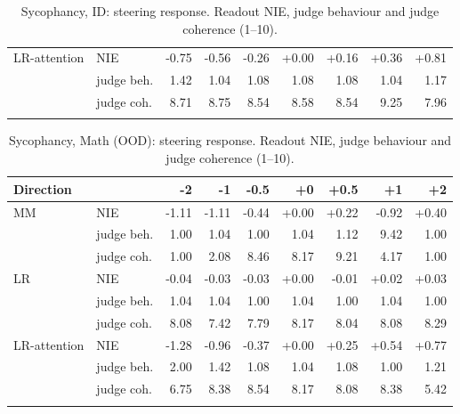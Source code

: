 \begin{table}[H]
\begin{minipage}[t]{0.49\textwidth}
\begin{tabular}{llrrrrrrr}
\addlinespace[2pt]
LR-attention & NIE & -0.75 & -0.56 & -0.26 & +0.00 & +0.16 & +0.36 & +0.81 \\
 & judge beh. & 1.42 & 1.04 & 1.08 & 1.08 & 1.08 & 1.04 & 1.17 \\
 & judge coh. & 8.71 & 8.75 & 8.54 & 8.58 & 8.54 & 9.25 & 7.96 \\
\addlinespace[2pt]
\bottomrule
\end{tabular}
\caption{Sycophancy, ID: steering response. Readout NIE, judge behaviour and judge coherence (1--10).}
\label{tab:app-steer-sycophancy-ID}
\end{minipage}
\end{table}

\begin{table}[H]
\centering
\begin{minipage}[t]{0.49\textwidth}
\centering
\centering
\scriptsize
\setlength{\tabcolsep}{3pt}
\begin{tabular}{llrrrrrrr}
\toprule
Direction & & -2 & -1 & -0.5 & +0 & +0.5 & +1 & +2 \\
\midrule
MM & NIE & -1.11 & -1.11 & -0.44 & +0.00 & +0.22 & -0.92 & +0.40 \\
 & judge beh. & 1.00 & 1.04 & 1.00 & 1.04 & 1.12 & 9.42 & 1.00 \\
 & judge coh. & 1.00 & 2.08 & 8.46 & 8.17 & 9.21 & 4.17 & 1.00 \\
\addlinespace[2pt]
LR & NIE & -0.04 & -0.03 & -0.03 & +0.00 & -0.01 & +0.02 & +0.03 \\
 & judge beh. & 1.04 & 1.04 & 1.00 & 1.04 & 1.00 & 1.04 & 1.00 \\
 & judge coh. & 8.08 & 7.42 & 7.79 & 8.17 & 8.04 & 8.08 & 8.29 \\
\addlinespace[2pt]
LR-attention & NIE & -1.28 & -0.96 & -0.37 & +0.00 & +0.25 & +0.54 & +0.77 \\
 & judge beh. & 2.00 & 1.42 & 1.08 & 1.04 & 1.08 & 1.00 & 1.21 \\
 & judge coh. & 6.75 & 8.38 & 8.54 & 8.17 & 8.08 & 8.38 & 5.42 \\
\addlinespace[2pt]
\bottomrule
\end{tabular}
\caption{Sycophancy, Math (OOD): steering response. Readout NIE, judge behaviour and judge coherence (1--10).}
\label{tab:app-steer-sycophancy-MathOOD}
\end{minipage}
\end{table}
